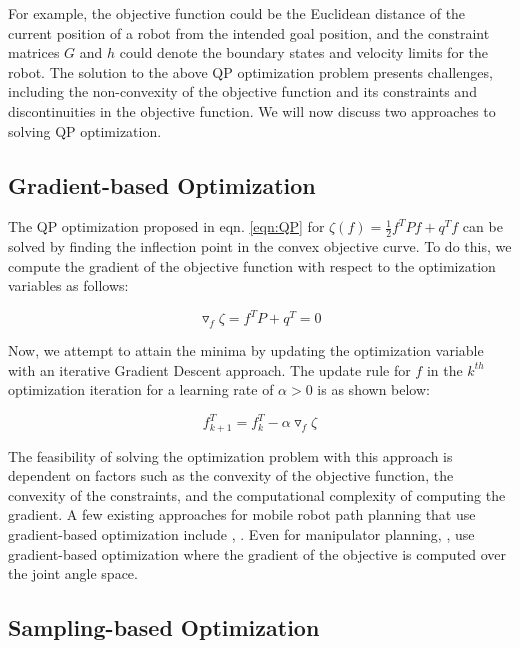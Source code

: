 For example, the objective function could be the Euclidean distance of the current position of a robot from the intended goal position, and the constraint matrices $G$ and $h$ could denote the boundary states and velocity limits for the robot. The solution to the above QP optimization problem presents challenges, including the non-convexity of the objective function and its constraints and discontinuities in the objective function. We will now discuss two approaches to solving QP optimization.

\subsection{Gradient-based Optimization}\label{sec:gradient-optim}
The QP optimization proposed in eqn. \ref{eqn:QP} for $\zeta(f) = \frac{1}{2}f^TPf + q^Tf$ can be solved by finding the inflection point in the convex objective curve. To do this, we compute the gradient of the objective function with respect to the optimization variables as follows:


\begin{equation}
    \triangledown_{f}{\zeta} = f^TP + q^T = 0
    \label{eqn:gradient}
\end{equation}

Now, we attempt to attain the minima by updating the optimization variable with an iterative Gradient Descent approach. The update rule for $f$ in the $k^{th}$ optimization iteration for a learning rate of $\alpha > 0$ is as shown below:

\begin{equation}
    f_{k+1}^T = f_k^T - \alpha \triangledown_{f}{\zeta}
\end{equation}

The feasibility of solving the optimization problem with this approach is dependent on factors such as the convexity of the objective function, the convexity of the constraints, and the computational complexity of computing the gradient. A few existing approaches for mobile robot path planning that use gradient-based optimization include \cite{aks_ral21}, \cite{CDC_time_scaling}. Even for manipulator planning, \cite{CHOMP}, \cite{STOMP} use gradient-based optimization where the gradient of the objective is computed over the joint angle space. 

\subsection{Sampling-based Optimization}\label{sec:sampling-optim}

